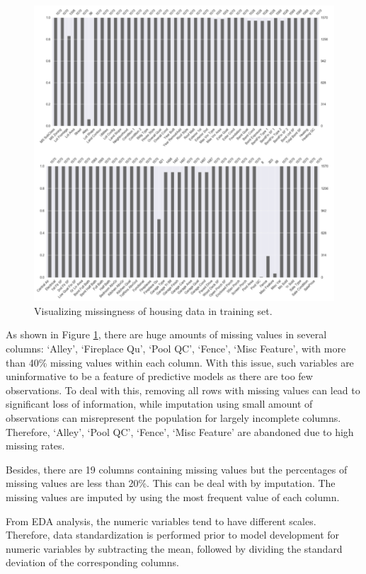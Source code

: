 \documentclass[letterpaper,12pt,twoside,]{pinp}
\begin{document}
\begin{figure}
\includegraphics[width=1\linewidth]{miss_plot.png}
\centering
\caption{Visualizing missingness of housing data in training set.}
\label{fig:miss}
\end{figure}

As shown in Figure \ref{fig:miss}, there are huge amounts of missing
values in several columns: `Alley', `Fireplace Qu', `Pool QC', `Fence',
`Misc Feature', with more than 40\% missing values within each column.
With this issue, such variables are uninformative to be a feature of
predictive models as there are too few observations. To deal with this,
removing all rows with missing values can lead to significant loss of
information, while imputation using small amount of observations can
misrepresent the population for largely incomplete columns. Therefore,
`Alley', `Pool QC', `Fence', `Misc Feature' are abandoned due to high
missing rates.

Besides, there are 19 columns containing missing values but the
percentages of missing values are less than 20\%. This can be deal with
by imputation. The missing values are imputed by using the most frequent
value of each column.

From EDA analysis, the numeric variables tend to have different scales.
Therefore, data standardization is performed prior to model development
for numeric variables by subtracting the mean, followed by dividing the
standard deviation of the corresponding columns.
\end{document}
